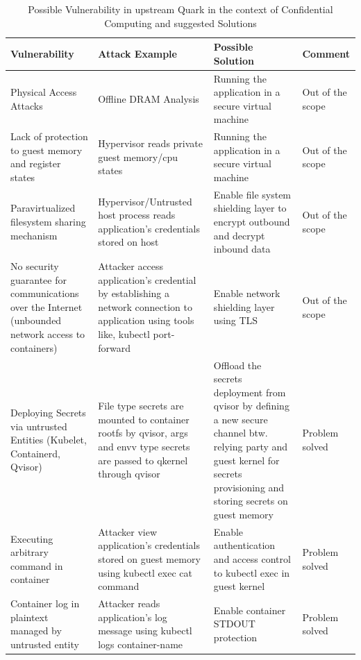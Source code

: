 \begin{table}[H]
    \tiny
    \caption{Possible Vulnerability in upstream Quark in the context of Confidential Computing and suggested Solutions}
    \label{crouch}
    \begin{tabular}{  p{3.4cm}  p{3.4cm}  p{3.4cm} p{2cm} }
        \toprule
\textbf{Vulnerability}      
& \textbf{Attack Example}   
& \textbf{Possible Solution}
& \textbf{Comment}  \\\midrule
Physical Access Attacks
& Offline DRAM Analysis          
& Running the application in a secure virtual machine
& Out of the scope   \\\hline
Lack of protection to guest memory and register states          
& Hypervisor reads private guest memory/cpu states                          
& Running the application in a secure virtual machine
& Out of the scope   \\\hline
Paravirtualized filesystem sharing mechanism       
& Hypervisor/Untrusted host process reads application’s credentials stored on host
& Enable file system shielding layer to encrypt outbound and decrypt inbound data 
& Out of the scope   \\\hline

No security guarantee for communications over the Internet (unbounded network access to containers)     
& Attacker access application’s credential by establishing a network connection to application using tools like, kubectl port-forward
& Enable network shielding layer using TLS
& Out of the scope   \\\hline

Deploying Secrets via untrusted Entities (Kubelet, Containerd, Qvisor)    
& File type secrets are mounted to container rootfs by qvisor, args and envv type secrets are passed to qkernel through qvisor
& Offload the secrets deployment from qvisor by defining a new secure channel btw. relying party and guest kernel for secrets provisioning and storing secrets on guest memory
& Problem solved  \\\hline

Executing arbitrary command in container  
& Attacker view application’s credentials stored on guest memory using kubectl exec cat command
& Enable authentication and access control to kubectl exec in guest kernel
& Problem solved  \\\hline


Container log in plaintext managed by untrusted entity
& Attacker reads application’s log message using kubectl logs container-name
& Enable container STDOUT protection
& Problem solved  \\\hline


\end{tabular}
\end{table}

